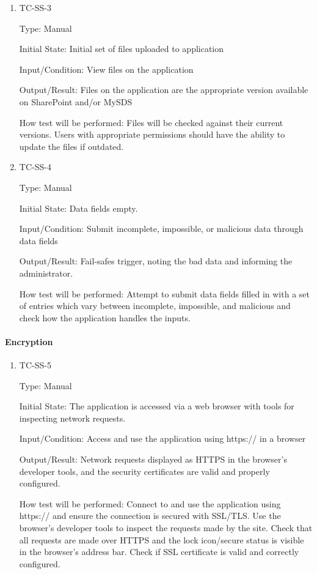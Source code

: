 \documentclass[12pt, titlepage]{article}
\begin{document}
\begin{enumerate}

  \item{TC-SS-3\\}

    Type: Manual

    Initial State: Initial set of files uploaded to application

    Input/Condition: View files on the application

    Output/Result: Files on the application are the appropriate
    version available on SharePoint and/or MySDS

    How test will be performed: Files will be checked against their
    current versions. Users with appropriate permissions should have
    the ability to update the files if outdated.

  \item{TC-SS-4\\}

    Type: Manual

    Initial State: Data fields empty.

    Input/Condition: Submit incomplete, impossible, or malicious data
    through data fields

    Output/Result: Fail-safes trigger, noting the bad data and
    informing the administrator.

    How test will be performed: Attempt to submit data fields filled
    in with a set of entries which vary between incomplete,
    impossible, and malicious and check how the application handles the inputs.

\end{enumerate}

\paragraph{Encryption}

\begin{enumerate}

  \item{TC-SS-5\\}

    Type: Manual

    Initial State: The application is accessed via a web browser with
    tools for inspecting network requests.

    Input/Condition: Access and use the application using https:// in a browser

    Output/Result: Network requests displayed as HTTPS in the
    browser's developer tools, and the security certificates are
    valid and properly configured.

    How test will be performed: Connect to and use the application
    using https:// and ensure the connection is secured with SSL/TLS.
    Use the browser's developer tools to inspect the requests made by
    the site. Check that all requests are made over HTTPS and the
    lock icon/secure status is visible in the browser's address bar.
    Check if SSL certificate is valid and correctly configured.

\end{enumerate}
\end{document}
